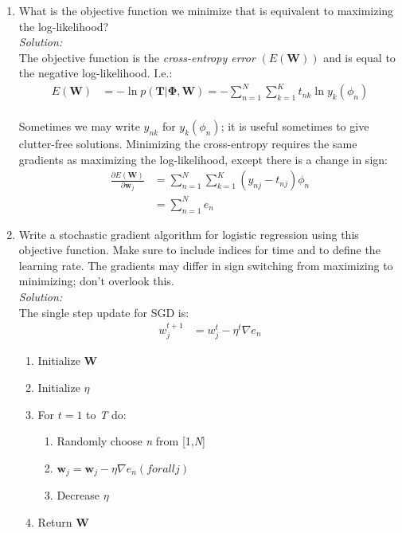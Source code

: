 \documentclass[12pt,a4paper]{article}
\begin{document}
\begin{enumerate}
		\item What is the objective function we minimize that is equivalent to maximizing the log-likelihood? \\
		\emph{Solution:} \\
		The objective function is the \textit{cross-entropy error} $(E(\textbf{W}))$ and is equal to the negative log-likelihood. I.e.: 
		\begin{align*}
		E(\textbf{W}) &= -\ln p(\textbf{T}|\boldsymbol{\Phi},\textbf{W}) = - \sum_{n=1}^{N}\sum_{k=1}^{K} t_{nk} \ln y_k(\phi_n)
		\end{align*}
		\\
		Sometimes we may write $y_{nk}$ for $y_k(\phi_n)$; it is useful sometimes to give clutter-free solutions. Minimizing the cross-entropy requires the same gradients as maximizing the log-likelihood, except there is a change in sign:
		\begin{align*}
		\frac{\partial E(\textbf{W})}{\partial \textbf{w}_j} &= \sum_{n=1}^{N}\sum_{k=1}^{K} (y_{nj} - t_{nj})\phi_n \\
		&= \sum_{n=1}^{N} e_n
		\end{align*}
		
		\item Write a stochastic gradient algorithm for logistic regression using this objective function. Make sure to include indices for time and to define the learning rate. The gradients may differ in sign switching from maximizing to minimizing; don't overlook this.\\
		\emph{Solution:} \\
		The single step update for SGD is:		    
		\begin{align*}
		w_j^{t+1} &= w_j^{t} - \eta^{t} \nabla e_n
		\end{align*}
		
		\begin{enumerate}[label=(\alph*)]
			\item Initialize \textbf{W}
			\item Initialize $\eta$
			\item For $\textit{t} = 1$ to \textit{T} do:
			\begin{enumerate}[label = (\roman*)]
				\item Randomly choose \textit{n} from 			 				[1,\textit{N}]
				\item $\textbf{w}_j = \textbf{w}_j - \eta\nabla 						e_n(for all \textit{j})$
				\item Decrease $\eta$
			\end{enumerate}
			\item Return \textbf{W}
		\end{enumerate}
		

\end{enumerate}
\end{document}
